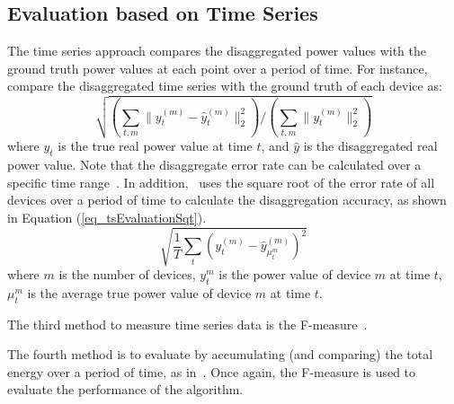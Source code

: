 \subsection{Evaluation based on Time Series}
The time series approach compares the disaggregated power values with the ground 
truth power values at each point over a period of time.
For instance, ~\cite{kolter2012aistat} compare the
disaggregated time series with the ground truth of each device as:
\begin{equation}
\label{eq_tsErrorRate}
\sqrt{(\sum_{t,m} \lVert y_t^{(m)}- \hat{y}_t^{(m)} \rVert_2^2)/(\sum_{t,m} \lVert y_t^{(m)}\rVert_2^2)}
\end{equation}
where $y_t$ is the true real power value at time $t$, 
and $\hat{y}$ is the disaggregated real power value. 
Note that the disaggregate error rate can be calculated over a
specific time range~\cite{kolter2012aistat}. 
In addition,~\cite{parson2012nonintrusive} uses the square root 
of the error rate of all devices over a period of time to calculate 
the disaggregation accuracy, as shown in Equation (\ref{eq_tsEvaluationSqt}). 
\begin{equation}
\label{eq_tsEvaluationSqt}
\sqrt{\frac{1}{T}\sum_t(y_t^{(m)}-\hat{y}_{\mu_t^m}^{(m)})^2}
\end{equation}
where $m$ is the number of devices, 
$y_t^m$ is the power value of device $m$ at time $t$,  
$\mu_t^m$ is the average true power value of device $m$ at time $t$. 


The third method to measure time series data is the
F-measure~\cite{kim2011unsupervised}.


The fourth method is to evaluate by accumulating  (and comparing)
the total energy over a period of time, as in~\cite{shao2012temporal}. Once again, 
the F-measure is used to evaluate the performance of the algorithm. 

